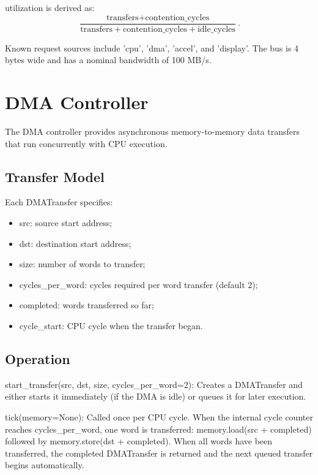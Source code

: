 \documentclass[12pt,a4paper,twoside]{book}
\theoremstyle{trinarytheorem}
\theoremstyle{trinarydefinition}
\newcommand{\code}[1]{\textsf{#1}}
\begin{document}
\noindent\code{utilization} is derived as:
\[
\frac{\text{transfers} + \text{contention\_cycles}}{\text{transfers} + \text{contention\_cycles} + \text{idle\_cycles}}.
\]

Known request sources include \code{'cpu'}, \code{'dma'},
\code{'accel'}, and \code{'display'}. The bus is 4 bytes wide and
has a nominal bandwidth of 100 MB/s.

\section{DMA Controller}

The \code{DMA} controller provides asynchronous memory-to-memory data
transfers that run concurrently with CPU execution.

\subsection{Transfer Model}

Each \code{DMATransfer} specifies:
\begin{itemize}
    \item \code{src}: source start address;
    \item \code{dst}: destination start address;
    \item \code{size}: number of words to transfer;
    \item \code{cycles\_per\_word}: cycles required per word transfer
          (default 2);
    \item \code{completed}: words transferred so far;
    \item \code{cycle\_start}: CPU cycle when the transfer began.
\end{itemize}

\subsection{Operation}

\noindent\code{start\_transfer(src, dst, size, cycles\_per\_word=2)}:
Creates a \code{DMATransfer} and either starts it immediately (if the DMA
is idle) or queues it for later execution.

\noindent\code{tick(memory=None)}: Called once per CPU cycle. When the
internal cycle counter reaches \code{cycles\_per\_word}, one word is
transferred: \code{memory.load(src + completed)} followed by
\code{memory.store(dst + completed)}. When all words have been
transferred, the completed \code{DMATransfer} is returned and the next
queued transfer begins automatically.
\end{document}
